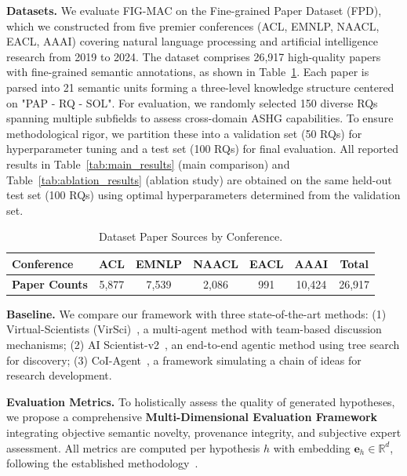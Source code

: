 \documentclass[runningheads]{llncs}
\begin{document}
\textbf{Datasets.} We evaluate FIG-MAC on the Fine-grained Paper Dataset (FPD), which we constructed from five premier conferences (ACL, EMNLP, NAACL, EACL, AAAI) covering natural language processing and artificial intelligence research from 2019 to 2024. The dataset comprises 26,917 high-quality papers with fine-grained semantic annotations, as shown in Table~\ref{tab:dataset_sources}. Each paper is parsed into 21 semantic units forming a three-level knowledge structure centered on "PAP - RQ - SOL". For evaluation, we randomly selected 150 diverse RQs spanning multiple subfields to assess cross-domain ASHG capabilities. To ensure methodological rigor, we partition these into a validation set (50 RQs) for hyperparameter tuning and a test set (100 RQs) for final evaluation. All reported results in Table~\ref{tab:main_results} (main comparison) and Table~\ref{tab:ablation_results} (ablation study) are obtained on the same held-out test set (100 RQs) using optimal hyperparameters determined from the validation set.

\begin{table}[t]
\centering
\small
\caption{Dataset Paper Sources by Conference.}
\label{tab:dataset_sources}
\begin{tabular}{lcccccc}
\toprule
\textbf{Conference} & ACL & EMNLP & NAACL & EACL & AAAI & \textbf{Total} \\
\midrule
\textbf{Paper Counts} & 5,877 & 7,539 & 2,086 & 991 & 10,424 & 26,917 \\
\bottomrule
\end{tabular}
\end{table}

\textbf{Baseline.} We compare our framework with three state-of-the-art methods: (1) Virtual-Scientists (VirSci)~\cite{DBLP:journals/corr/abs-2410-09403}, a multi-agent method with team-based discussion mechanisms; (2) AI Scientist-v2~\cite{DBLP:journals/corr/abs-2408-06292}, an end-to-end agentic method using tree search for discovery; (3) CoI-Agent~\cite{li2024chain}, a framework simulating a chain of ideas for research development.

\textbf{Evaluation Metrics.} To holistically assess the quality of generated hypotheses, we propose a comprehensive \textbf{Multi-Dimensional Evaluation Framework} integrating objective semantic novelty, provenance integrity, and subjective expert assessment. All metrics are computed per hypothesis $h$ with embedding $\mathbf{e}_h \in \mathbb{R}^d$, following the established methodology~\cite{su2025many}.
\end{document}

